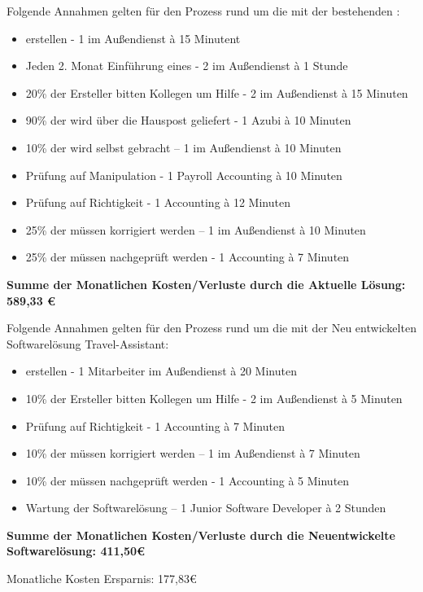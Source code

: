 Folgende Annahmen gelten für den Prozess rund um die  mit der bestehenden :
\begin{itemize}
\item {} erstellen - 1  im Außendienst à 15 Minutent
\item Jeden 2. Monat Einführung eines  - 2  im Außendienst à 1 Stunde
\item 20\% der Ersteller bitten Kollegen um Hilfe - 2  im Außendienst à 15 Minuten
\item 90\% der  wird über die Hauspost geliefert - 1 Azubi à 10 Minuten
\item 10\% der  wird selbst gebracht – 1  im Außendienst à 10 Minuten
\item Prüfung auf Manipulation - 1  Payroll Accounting à 10 Minuten
\item Prüfung auf Richtigkeit - 1  Accounting à 12 Minuten
\item 25\% der  müssen korrigiert werden – 1  im Außendienst à 10 Minuten
\item 25\% der  müssen nachgeprüft werden - 1  Accounting à 7 Minuten
\end{itemize}

\textbf{Summe der Monatlichen Kosten/Verluste durch die Aktuelle Lösung: 589,33 €}

Folgende Annahmen gelten für den Prozess rund um die  mit der Neu entwickelten Softwarelösung Travel-Assistant:
\begin{itemize}
\item {} erstellen - 1 Mitarbeiter im Außendienst à 20 Minuten
\item 10\% der Ersteller bitten Kollegen um Hilfe - 2  im Außendienst à 5 Minuten
\item Prüfung auf Richtigkeit - 1  Accounting à 7 Minuten
\item 10\% der  müssen korrigiert werden – 1  im Außendienst à 7 Minuten
\item 10\% der  müssen nachgeprüft werden - 1  Accounting à 5 Minuten
\item Wartung der Softwarelösung – 1 Junior Software Developer à 2 Stunden
\end{itemize}

\textbf{Summe der Monatlichen Kosten/Verluste durch die Neuentwickelte Softwarelösung: 411,50€}

Monatliche Kosten Ersparnis: 177,83€

